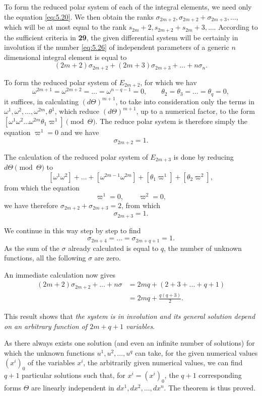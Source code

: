 To form the reduced polar system of each of the integral elements, we need only the equation \eqref{eq:5.20}. We then obtain the ranks $\sigma_{2m+2},\sigma_{2m+2}+\sigma_{2m+3},\dots$, which will be at most equal to the rank $s_{2m}+2,s_{2m+2}+s_{2m}+3,\dots$. According to the sufficient criteria in \textsection\textbf{29}, the given differential system will be certainly in involution if the number \eqref{eq:5.26} of independent parameters of a generic $n$ dimensional integral element is equal to
\[
(2m+2)\sigma_{2m+2}+(2m+3)\sigma_{2m+3}+\dots+n\sigma_{n}.
\]



\vspace{12pt}\fsec To form the reduced polar system of $E_{2m+2}$, for which we hav
\[
\omega^{2m+1}=\omega^{2m+2}=\dots=\omega^{n-q-1}=0,\qquad\theta_{2}=\theta_{3}=\dots=\theta_{q}=0,
\]
it suffices, in calculating $(d\Theta)^{m+1}$, to take into consideration only the terms in $\omega^{1},\omega^{2},\dots,\omega^{2m},\theta^{1}$, which reduce $(d\Theta)^{m+1}$, up to a numerical factor, to the form $[\omega^{1}\omega^{2}\dots\omega^{2m}\theta_{1}\varpi^{1}]\pmod{\Theta}$. The reduce polar system is therefore simply the equation $\varpi^{1}=0$ and we have
\[
\sigma_{2m+2}=1.
\]

The calculation of the reduced polar system of $E_{2m+3}$ is done by reducing $d\Theta\pmod{\Theta}$ to
\[
[\omega^{1}\omega^{2}]+\dots+[\omega^{2m-1}\omega^{2m}]+[\theta_{1}\varpi^{1}]+[\theta_{2}\varpi^{2}],
\]
from which the equation
\[
\varpi^{1}=0,\qquad\varpi^{2}=0,
\]
we have therefore $\sigma_{2m+2}+\sigma_{2m+3}=2$, from which
\[
\sigma_{2m+3}=1.
\]

We continue in this way step by step to find
\[
\sigma_{2m+4}=\dots=\sigma_{2m+q+1}=1.
\]
As the sum of the $\sigma$ already calculated is equal to $q$, the number of unknown functions, all the following $\sigma$ are zero.

An immediate calculation now gives
\begin{align*}
  (2m+2)\sigma_{2m+2}+\dots+n\sigma&=2mq+(2+3+\dots+q+1)\\
  &=2mq+\frac{q(q+3)}{2}.
\end{align*}

This result shows that \emph{the system is in involution and its general solution depend on an arbitrary function of $2m+q+1$ variables}.

As there always exists one solution (and even an infinite number of solutions) for which the unknown functions $u^{1},u^{2},\dots,u^{q}$ can take, for the given numerical values $(x^{i})_{0}$ of the variables $x^{i}$, the arbitrarily given numerical values, we can find $q+1$ particular solutions such that, for $x^{i}=(x^{i})_{0}$, the $q+1$ corresponding forms $\Theta$ are linearly independent in $dx^{1},dx^{2},\dots,dx^{n}$. The theorem is thus proved.

